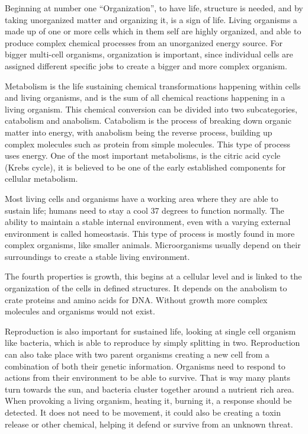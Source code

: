 Beginning at number one “Organization”, to have life, structure is needed, and by taking unorganized matter and organizing it, is a sign of life. Living organisms a made up of one or more cells which in them self are highly organized, and able to produce complex chemical processes from an unorganized energy source. For bigger multi-cell organisms, organization is important, since individual cells are assigned different specific jobs to create a bigger and more complex organism. \par  
Metabolism is the life sustaining chemical transformations happening within cells and living organisms, and is the sum of all chemical reactions happening in a living organism. This chemical conversion can be divided into two subcategories, catabolism and anabolism. Catabolism is the process of breaking down organic matter into energy, with anabolism being the reverse process, building up complex molecules such as protein from simple molecules. This type of process uses energy. One of the most important metabolisms, is the citric acid cycle (Krebs cycle), it is believed to be one of the early established components for cellular metabolism. \par
Most living cells and organisms have a working area where they are able to sustain life; humans need to stay a cool 37 degrees to function normally. The ability to maintain a stable internal environment, even with a varying external environment is called homeostasis. This type of process is mostly found in more complex organisms, like smaller animals. Microorganisms usually depend on their surroundings to create a stable living environment.\par
The fourth properties is growth, this begins at a cellular level and is linked to the organization of the cells in defined structures. It depends on the anabolism to crate proteins and amino acids for DNA. Without growth more complex molecules and organisms would not exist.\par
Reproduction is also important for sustained life, looking at single cell organism like bacteria, which is able to reproduce by simply splitting in two. Reproduction can also take place with two parent organisms creating a new cell from a combination of both their genetic information. 
Organisms need to respond to actions from their environment to be able to survive. That is way many plants turn towards the sun, and bacteria cluster together around a nutrient rich area. When provoking a living organism, heating it, burning it, a response should be detected. It does not need to be movement, it could also be creating a toxin release or other chemical, helping it defend or survive from an unknown threat. \par
